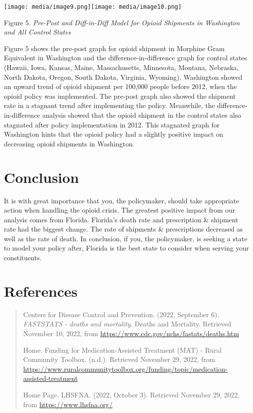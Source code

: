 \documentclass{article}
\begin{document}
\texttt{[image: media/image9.png]}\texttt{[image: media/image10.png]}

Figure 5. \emph{Pre-Post and Diff-in-Diff Model for Opioid Shipments in
Washington and All Control States}

Figure 5 shows the pre-post graph for opioid shipment in Morphine Gram
Equivalent in Washington and the difference-in-difference graph for
control states (Hawaii, Iowa, Kansas, Maine, Massachusetts, Minnesota,
Montana, Nebraska, North Dakota, Oregon, South Dakota, Virginia,
Wyoming). Washington showed an upward trend of opioid shipment per
100,000 people before 2012, when the opioid policy was implemented. The
pre-post graph also showed the shipment rate in a stagnant trend after
implementing the policy. Meanwhile, the difference-in-difference
analysis showed that the opioid shipment in the control states also
stagnated after policy implementation in 2012. This stagnated graph for
Washington hints that the opioid policy had a slightly positive impact
on decreasing opioid shipments in Washington.

\section{Conclusion}

It is with great importance that you, the policymaker, should take
appropriate action when handling the opioid crisis. The greatest
positive impact from our analysis comes from Florida. Florida's death
rate and prescription \& shipment rate had the biggest change. The rate
of shipments \& prescriptions decreased as well as the rate of death. In
conclusion, if you, the policymaker, is seeking a state to model your
policy after, Florida is the best state to consider when serving your
constituents.

\section{References}

\begin{quote}
Centers for Disease Control and Prevention. (2022, September 6).
\emph{FASTSTATS - deaths and mortality}. Deaths and Mortality. Retrieved
November 10, 2022, from
\href{https://www.cdc.gov/nchs/fastats/deaths.htm}{{https://www.cdc.gov/nchs/fastats/deaths.htm}}

Home. Funding for Medication-Assisted Treatment (MAT) - Rural Community
Toolbox. (n.d.). Retrieved November 29, 2022, from
\href{https://www.ruralcommunitytoolbox.org/funding/topic/medication-assisted-treatment}{{https://www.ruralcommunitytoolbox.org/funding/topic/medication-assisted-treatment}}

Home Page. LHSFNA. (2022, October 3). Retrieved November 29, 2022, from
\href{https://www.lhsfna.org/}{{https://www.lhsfna.org/}}
\end{quote}
\end{document}
